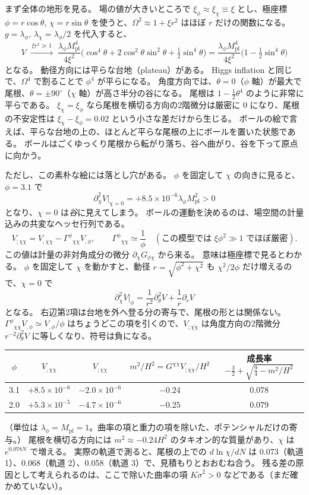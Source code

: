 \documentclass[a4paper,11pt]{ltjsarticle}
\newcommand{\Mpl}{M_{\mathrm{pl}}}
\begin{document}
まず全体の地形を見る。
場の値が大きいところで $\xi_\phi\approx\xi_\chi\equiv\xi$ とし、極座標 $\phi=r\cos\theta$, $\chi=r\sin\theta$ を使うと、$\Omega^2\approx1+\xi r^2$ はほぼ $r$ だけの関数になる。
$g=\lambda_\phi$, $\lambda_\chi=\lambda_\phi/2$ を代入すると、
\begin{equation}
V\;\xrightarrow{\ \xi r^2\gg1\ }\;\frac{\lambda_\phi\Mpl^4}{4\xi^2}\Big(\cos^4\theta+2\cos^2\theta\sin^2\theta+\tfrac12\sin^4\theta\Big)
=\frac{\lambda_\phi\Mpl^4}{4\xi^2}\Big(1-\tfrac12\sin^4\theta\Big)
\label{eq:kms-angular}
\end{equation}
となる。
動径方向には平らな台地（plateau）がある。
Higgs inflation と同じで、$\Omega^4$ で割ることで $\phi^4$ が平らになる。
角度方向では、$\theta=0$（$\phi$ 軸）が最大で尾根、$\theta=\pm90^\circ$（$\chi$ 軸）が高さ半分の谷になる。
尾根は $1-\tfrac12\theta^4$ のように非常に平らである。
$\xi_\chi=\xi_\phi$ なら尾根を横切る方向の2階微分は厳密に 0 になり、尾根の不安定性は $\xi_\chi-\xi_\phi=0.02$ という小さな差だけから生じる。
ボールの絵で言えば、平らな台地の上の、ほとんど平らな尾根の上にボールを置いた状態である。
ボールはごくゆっくり尾根から転がり落ち、谷へ曲がり、谷を下って原点に向かう。

ただし、この素朴な絵には落とし穴がある。
$\phi$ を固定して $\chi$ の向きに見ると、$\phi=3.1$ で
\[
\partial_\chi^2V\big|_{\chi=0}=+8.5\times10^{-6}\lambda_\phi\Mpl^2>0
\]
となり、$\chi=0$ は\emph{谷}に見えてしまう。
ボールの運動を決めるのは、場空間の計量込みの共変なヘッセ行列である。
\[
V_{;\chi\chi}=V_{,\chi\chi}-\Gamma^\phi{}_{\chi\chi}V_{,\phi},\qquad
\Gamma^\phi{}_{\chi\chi}\simeq\frac1\phi\quad(\text{この模型では }\xi\phi^2\gg1\text{ でほぼ厳密}).
\]
この値は計量の非対角成分の微分 $\partial_\chi G_{\phi\chi}$ から来る。
意味は極座標で見るとわかる。
$\phi$ を固定して $\chi$ を動かすと、動径 $r=\sqrt{\phi^2+\chi^2}$ も $\chi^2/2\phi$ だけ増えるので、$\chi=0$ で
\[
\partial_\chi^2V\big|_\phi=\frac1{r^2}\partial_\theta^2V+\frac1r\partial_rV
\]
となる。
右辺第2項は台地を外へ登る分の寄与で、尾根の形とは関係ない。
$\Gamma^\phi{}_{\chi\chi}V_{,\phi}\simeq V_{,\phi}/\phi$ はちょうどこの項を引くので、$V_{;\chi\chi}$ は角度方向の2階微分 $r^{-2}\partial_\theta^2V$ に等しくなり、符号は負になる。
\begin{center}
\begin{tabular}{ccccc}
\toprule
$\phi$ & $V_{,\chi\chi}$ & $V_{;\chi\chi}$ & $m^2/H^2=G^{\chi\chi}V_{;\chi\chi}/H^2$ & 成長率 $-\tfrac32+\sqrt{\tfrac94-m^2/H^2}$ \\
\midrule
3.1 & $+8.5\times10^{-6}$ & $-2.0\times10^{-6}$ & $-0.24$ & 0.078 \\
2.0 & $+5.3\times10^{-5}$ & $-4.7\times10^{-6}$ & $-0.25$ & 0.079 \\
\bottomrule
\end{tabular}
\end{center}
（単位は $\lambda_\phi=\Mpl=1$。曲率の項と重力の項を除いた、ポテンシャルだけの寄与。）
尾根を横切る方向には $m^2\approx-0.24H^2$ のタキオン的な質量があり、$\chi$ は $e^{0.078N}$ で増える。
実際の軌道で測ると、尾根の上での $d\ln\chi/dN$ は 0.073（軌道 1）、0.068（軌道 2）、0.058（軌道 3）で、見積もりとおおむね合う。
残る差の原因として考えられるのは、ここで除いた曲率の項 $K\dot\sigma^2>0$ などである（まだ確かめていない）。
\end{document}
